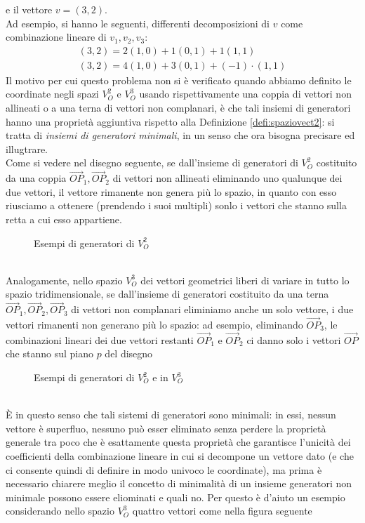 e il vettore $v=(3,2)$.\\
Ad esempio, si hanno le seguenti, differenti decomposizioni di $v$ come combinazione lineare di $v_1,v_2,v_3$:
\begin{eqnarray*}
  (3,2)=2(1,0)+1(0,1)+1(1,1)\\
  (3,2)=4(1,0)+3(0,1)+(-1)\cdot(1,1)
\end{eqnarray*}
Il motivo per cui questo problema non si è verificato quando abbiamo definito le coordinate negli spazi $V_O^2$ e $V_O^3$ usando rispettivamente una coppia di vettori non allineati o a una terna di vettori non complanari, è che tali insiemi di generatori hanno una proprietà aggiuntiva rispetto alla Definizione \ref{defi:spaziovect2}: si tratta di \textit{insiemi di generatori minimali}, in un senso che ora bisogna precisare ed illugtrare.\\
Come si vedere nel disegno seguente, se dall'insieme di generatori di $V_O^2$ costituito da una coppia $\vec{OP}_1,\vec{OP}_2$ di vettori non allineati eliminando uno qualunque dei due vettori, il vettore rimanente non genera più lo spazio, in quanto con esso riusciamo a ottenere (prendendo i suoi multipli) sonlo i vettori che stanno sulla retta a cui esso appartiene. 
\begin{figure}[ht!]
  \centering
  \resizebox{5cm}{!}{
    
  }
  \caption{Esempi di generatori di $V_O^2$}
  \label{fig:generatoriInVO2}
\end{figure}\\
Analogamente, nello spazio $V_O^3$ dei vettori geometrici liberi di variare in tutto lo spazio tridimensionale, se dall'insieme di generatori costituito da una terna $\vec{OP}_1,\vec{OP}_2,\vec{OP}_3$ di vettori non complanari eliminiamo anche un solo vettore, i due vettori rimanenti non generano più lo spazio: ad esempio, eliminando $\vec{OP}_3$, le combinazioni lineari dei due vettori restanti $\vec{OP}_1$ e $\vec{OP}_2$ ci danno solo i vettori $\vec{OP}$ che stanno sul piano $p$ del disegno
\begin{figure}[ht!]
  \centering
  \resizebox{5cm}{!}{
    
  }
  \caption{Esempi di generatori di $V_O^2$ e in $V_O^3$}
  \label{fig:generatoriInVO2VO3}
\end{figure}\\
È in questo senso che tali sistemi di generatori sono minimali: in essi, nessun vettore è superfluo, nessuno può esser eliminato senza perdere la proprietà generale tra poco che è esattamente questa proprietà che garantisce l'unicità dei coefficienti della combinazione lineare in cui si decompone un vettore dato (e che ci consente quindi di definire in modo univoco le coordinate), ma prima è necessario chiarere meglio il concetto di minimalità di un insieme generatori non minimale possono essere eliominati e quali no. Per questo è d'aiuto un esempio considerando nello spazio $V_O^3$ quattro vettori come nella figura seguente
